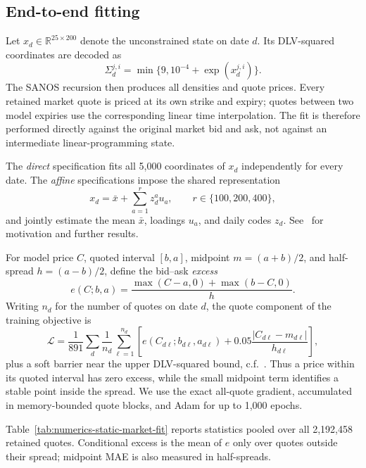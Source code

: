 \documentclass[11pt]{article}
\newcommand{\abs}[1]{\lvert #1\rvert}
\theoremstyle{plain}
\theoremstyle{definition}
\theoremstyle{remark}
\begin{document}
\subsection{End-to-end fitting}
\label{sec:estimation-fit}

Let $x_d\in\mathbb R^{25\times200}$ denote the unconstrained state on date
$d$. Its DLV-squared coordinates are decoded as
\[
\Sigma_d^{j,i}=\min\{9,10^{-4}+\exp(x_d^{j,i})\}.
\]
The SANOS recursion then produces all densities and quote prices. Every
retained market quote is priced at its own strike and expiry; quotes between
two model expiries use the corresponding linear time interpolation. The fit is
therefore performed directly against the original market bid and ask, not
against an intermediate linear-programming state.

The \emph{direct} specification fits all 5,000 coordinates of $x_d$
independently for every date. The \emph{affine} specifications impose
the shared representation
\begin{equation}
\label{eq:estimation-affine-state}
x_d=\bar x+\sum_{a=1}^r z_d^a u_a,
\qquad r\in\{100,200,400\},
\end{equation}
and jointly estimate the mean $\bar x$, loadings $u_a$, and daily codes $z_d$. See~\cite{DYSANOS2026}
for motivation and further results.

For model price $C$, quoted interval $[b,a]$, midpoint $m=(a+b)/2$, and
half-spread $h=(a-b)/2$, define the bid--ask \emph{excess}
\[
e(C;b,a)=\frac{\max(C-a,0)+\max(b-C,0)}{h}.
\]
Writing $n_d$ for the number of quotes on date $d$, the quote component of the
training objective is
\begin{equation}
\label{eq:estimation-quote-objective}
\mathcal L
=\frac1{891}\sum_d\frac1{n_d}\sum_{\ell=1}^{n_d}
\left[
e(C_{d\ell};b_{d\ell},a_{d\ell})
+0.05\frac{\abs{C_{d\ell}-m_{d\ell}}}{h_{d\ell}}
\right],
\end{equation}
plus a soft barrier near the upper DLV-squared bound, c.f.~\cite{DYSANOS2026}. Thus a price within its
quoted interval has zero excess, while the small midpoint term identifies a
stable point inside the spread. We use the exact all-quote gradient, accumulated
in memory-bounded quote blocks, and Adam for up to 1,000 epochs.

\label{sec:estimation-results}
Table~\ref{tab:numerics-static-market-fit} reports statistics pooled over all
2,192,458 retained quotes. Conditional excess is the mean of $e$ only over
quotes outside their spread; midpoint MAE is also measured in half-spreads.
\end{document}
